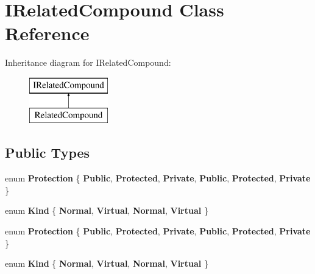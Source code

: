 \hypertarget{class_i_related_compound}{}\section{I\+Related\+Compound Class Reference}
\label{class_i_related_compound}
Inheritance diagram for I\+Related\+Compound\+:\begin{figure}[H]
\begin{center}
\leavevmode
\includegraphics[height=2.000000cm]{class_i_related_compound}
\end{center}
\end{figure}
\subsection*{Public Types}
\begin{DoxyCompactItemize}
\item 
\mbox{\label{class_i_related_compound_ac12e6e12784095cde8962012102e9709}} 
enum {\bfseries Protection} \{ \newline
{\bfseries Public}, 
{\bfseries Protected}, 
{\bfseries Private}, 
{\bfseries Public}, 
\newline
{\bfseries Protected}, 
{\bfseries Private}
 \}
\item 
\mbox{\label{class_i_related_compound_a70abfb2e64571aa06b83bd7da0888363}} 
enum {\bfseries Kind} \{ {\bfseries Normal}, 
{\bfseries Virtual}, 
{\bfseries Normal}, 
{\bfseries Virtual}
 \}
\item 
\mbox{\label{class_i_related_compound_ac12e6e12784095cde8962012102e9709}} 
enum {\bfseries Protection} \{ \newline
{\bfseries Public}, 
{\bfseries Protected}, 
{\bfseries Private}, 
{\bfseries Public}, 
\newline
{\bfseries Protected}, 
{\bfseries Private}
 \}
\item 
\mbox{\label{class_i_related_compound_a70abfb2e64571aa06b83bd7da0888363}} 
enum {\bfseries Kind} \{ {\bfseries Normal}, 
{\bfseries Virtual}, 
{\bfseries Normal}, 
{\bfseries Virtual}
 \}
\end{DoxyCompactItemize}
